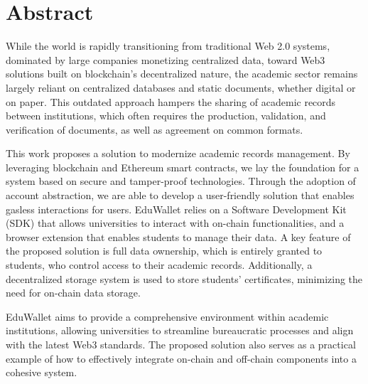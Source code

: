 \chapter*{Abstract}
While the world is rapidly transitioning from traditional Web 2.0 systems, dominated by large companies monetizing centralized data, toward Web3 solutions built on blockchain’s decentralized nature,  the academic sector remains largely reliant on centralized databases and static documents, whether digital or on paper. This outdated approach hampers the sharing of academic records between institutions, which often requires the production, validation, and verification of documents, as well as agreement on common formats.

This work proposes a solution to modernize academic records management. By leveraging blockchain and Ethereum smart contracts, we lay the foundation for a system based on secure and tamper-proof technologies. Through the adoption of account abstraction, we are able to develop a user-friendly solution that enables gasless interactions for users. EduWallet relies on a Software Development Kit (SDK) that allows universities to interact with on-chain functionalities, and a browser extension that enables students to manage their data. A key feature of the proposed solution is full data ownership, which is entirely granted to students, who control access to their academic records. Additionally, a decentralized storage system is used to store students’ certificates, minimizing the need for on-chain data storage.

EduWallet aims to provide a comprehensive environment within academic institutions, allowing universities to streamline bureaucratic processes and align with the latest Web3 standards. The proposed solution also serves as a practical example of how to effectively integrate on-chain and off-chain components into a cohesive system.